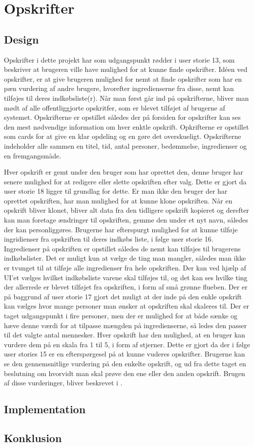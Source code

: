\section{Opskrifter}
\subsection{Design}
Opskrifter i dette projekt har som udgangspunkt rødder i user storie 13, som beskriver at brugeren ville have mulighed for at kunne finde opskrifter.
Idéen ved opskrifter, er at give brugeren mulighed for nemt at finde opskrifter som har en pæn vurdering af andre brugere, hvorefter ingredienserne fra disse, nemt kan tilføjes til deres indkøbsliste(r).
Når man først går ind på opskrifterne, bliver man mødt af alle offentliggjorte opskritfer, som er blevet tilføjet af brugerne af systemet.
Opskrifterne er opstillet således der på forsiden for opskrifter kan ses den mest nødvendige information om hver enktle opskrift.
Opkrifterne er opstillet som cards for at give en klar opdeling og en gøre det overskueligt.
Opskrifterne indeholder alle sammen en titel, tid, antal personer, bedømmelse, ingredienser og en fremgangsmåde.


Hver opskrift er gemt under den bruger som har oprettet den, denne bruger har senere mulighed for at redigere eller slette opskriften efter valg.
Dette er gjort da user storie 18 ligger til grundlag for dette.
Er man ikke den bruger der har oprettet opskriften, har man mulighed for at kunne klone opskriften.
Når en opskrift bliver klonet, bliver alt data fra den tidligere opskrift kopieret og derefter kan man foretage ændringer til opskriften, gemme den under et nyt navn, således der kan personliggøres.
Brugerne har efterspurgt mulighed for at kunne tilføje ingridienser fra opskriften til deres indkøbs liste, i følge user storie 16.
Ingredienser på opskriften er opstillet således de nemt kan tilføjes til brugerens indkøbslister.
Det er muligt kun at vælge de ting man mangler, således man ikke er tvunget til at tilføje alle ingredienser fra hele opskriften.
Der kan ved hjælp af UI'et vælges hvilket indkøbsliste varene skal tilføjes til, og det kan ses hvilke ting der allerrede er blevet tilføjet fra opskriften, i form af små grønne flueben.
Der er på baggrund af user storie 17 gjort det muligt at der inde på den enkle opskrift kan vælges hvor mange personer man ønsker at opskriften skal skaleres til.
Der er taget udgangspunkt i fire personer, men der er mulighed for at både sænke og hæve denne værdi for at tilpasse mængden på ingredienserne, så ledes den passer til det valgte antal mennesker.
Hver opskrift har den mulighed, at en bruger kan vurdere dem på en skala fra 1 til 5, i form af stjerner. Dette er gjort da der i følge user stories 15 er en efterspørgesel på at kunne vuderes opskrifter.
Brugerne kan se den gennemsnitlige vurdering på den enkelte opskrift, og ud fra dette taget en beslutning om hvorvidt man skal prøve den ene eller den anden opskrift.
Brugen af disse vurderinger, bliver beskrevet i .


\subsection{Implementation}
\subsection{Konklusion}


